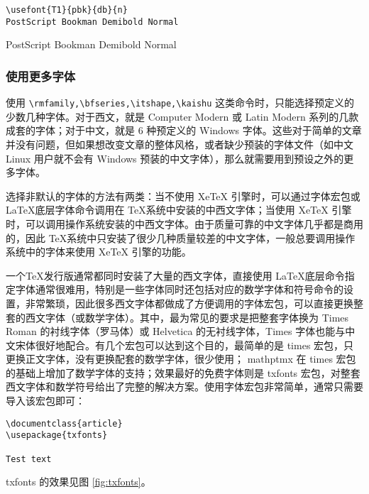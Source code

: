 \begin{minipage}[t]{0.45\textwidth}
\begin{lstlisting}
\usefont{T1}{pbk}{db}{n}
PostScript Bookman Demibold Normal
\end{lstlisting}
\end{minipage}
\hfill
\begin{minipage}[t]{0.45\textwidth}
    PostScript Bookman Demibold Normal
\end{minipage}

\subsubsection{使用更多字体}

使用 \verb|\rmfamily,\bfseries,\itshape,\kaishu| 这类命令时，只能选择预定义的少数几种字体。对于西文，就是 Computer Modern 或 Latin Modern 系列的几款成套的字体；对于中文，就是 6 种预定义的 Windows 字体。这些对于简单的文章并没有问题，但如果想改变文章的整体风格，或者缺少预装的字体文件（如中文 Linux 用户就不会有 Windows 预装的中文字体），那么就需要用到预设之外的更多字体。

选择非默认的字体的方法有两类：当不使用 XeTeX 引擎时，可以通过字体宏包或 \LaTeX 底层字体命令调用在 \TeX 系统中安装的中西文字体；当使用 XeTeX 引擎时，可以调用操作系统安装的中西文字体。由于质量可靠的中文字体几乎都是商用的，因此 \TeX 系统中只安装了很少几种质量较差的中文字体，一般总要调用操作系统中的字体来使用 XeTeX 引擎的功能。

一个\TeX 发行版通常都同时安装了大量的西文字体，直接使用 \LaTeX 底层命令指定字体通常很难用，特别是一些字体同时还包括对应的数学字体和符号命令的设置，非常繁琐，因此很多西文字体都做成了方便调用的字体宏包，可以直接更换整套的西文字体（或数学字体）。其中，最为常见的要求是把整套字体换为 Times Roman 的衬线字体（罗马体）或  Helvetica 的无衬线字体，Times 字体也能与中文宋体很好地配合。有几个宏包可以达到这个目的，最简单的是 times 宏包，只更换正文字体，没有更换配套的数学字体，很少使用； mathptmx 在 times 宏包的基础上增加了数学字体的支持；效果最好的免费字体则是 txfonts 宏包，对整套西文字体和数学符号给出了完整的解决方案。使用字体宏包非常简单，通常只需要导入该宏包即可：

\begin{lstlisting}
\documentclass{article}
\usepackage{txfonts}

Test text

\end{lstlisting}

txfonts 的效果见图 \ref{fig:txfonts}。

